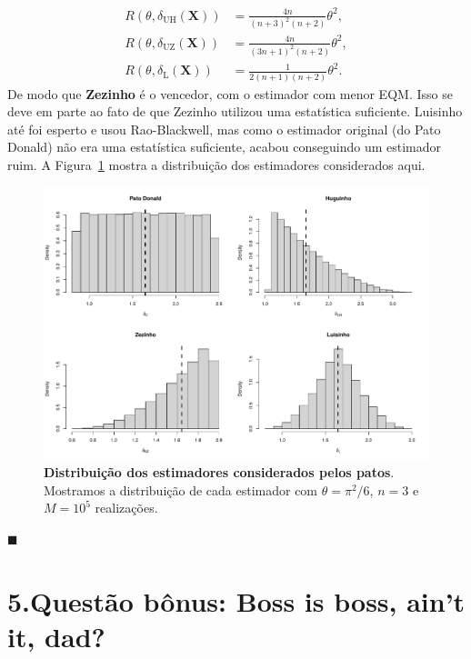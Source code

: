 \documentclass[a4paper,10pt, notitlepage]{report}
\newcommand{\bX}{\boldsymbol{X}} %
\begin{document}
{\begin{align*}
 R(\theta, \delta_{\text{UH}}(\bX)) &= \frac{4n}{(n+3)^2(n+2)}\theta^2,\\
 R(\theta, \delta_{\text{UZ}}(\bX)) &= \frac{4n}{(3n+1)^2(n+2)}\theta^2,\\
 R(\theta, \delta_{\text{L}}(\bX)) &= \frac{1}{2(n+1)(n+2)}\theta^2.
\end{align*}
De modo que \textbf{Zezinho} é o vencedor, com o estimador com menor EQM.
Isso se deve em parte ao fato de que Zezinho utilizou uma estatística suficiente.
Luisinho até foi esperto e usou Rao-Blackwell, mas como o estimador original (do Pato Donald) não era uma estatística suficiente, acabou conseguindo um estimador ruim.
A Figura~\ref{fig:duck_ests} mostra a distribuição dos estimadores considerados aqui.
\begin{figure}[!ht]
\begin{center}
\includegraphics[scale=0.4]{ests_Q4.pdf}    
\end{center}
\caption{\textbf{Distribuição dos estimadores considerados pelos patos}.
Mostramos a distribuição de cada estimador com $\theta = \pi^2/6$, $n = 3$ e $M = 10^5$ realizações.
}
\label{fig:duck_ests}
\end{figure}
$\blacksquare$
}

\newpage
\section*{5.Questão bônus: Boss is boss, ain't it, dad?}
\end{document}
